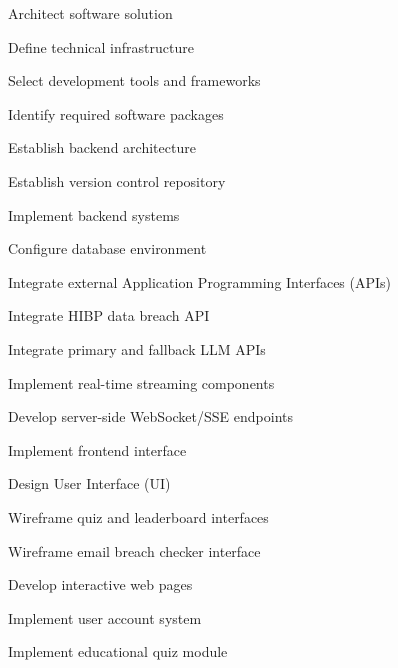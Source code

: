\documentclass[11pt, a4paper]{report}
\begin{document}
\begin{wbs}
    \item Architect software solution
    \begin{wbs}
        \item Define technical infrastructure
        \begin{wbs}
            \item Select development tools and frameworks
            \item Identify required software packages
            \item Establish backend architecture
        \end{wbs}
    \end{wbs}
    
    \item Establish version control repository
    
    \item Implement backend systems
    \begin{wbs}
        \item Configure database environment
        \item Integrate external Application Programming Interfaces (APIs)
        \begin{wbs}
            \item Integrate HIBP data breach API
            \item Integrate primary and fallback LLM APIs
        \end{wbs}
        \item Implement real-time streaming components
        \begin{wbs}
            \item Develop server-side WebSocket/SSE endpoints
        \end{wbs}
    \end{wbs}
    
    \item Implement frontend interface
    \begin{wbs}
        \item Design User Interface (UI)
        \begin{wbs}
            \item Wireframe quiz and leaderboard interfaces
            \item Wireframe email breach checker interface
        \end{wbs}
        \item Develop interactive web pages
        \begin{wbs}
            \item Implement user account system
            \item Implement educational quiz module
        \end{wbs}
    \end{wbs}
\end{wbs}
\end{document}
